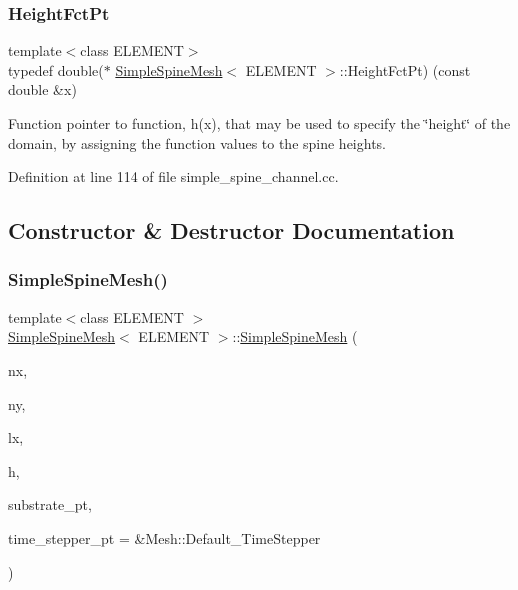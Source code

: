 \subsubsection{\texorpdfstring{Height\+Fct\+Pt}{HeightFctPt}}
{\footnotesize\ttfamily template$<$class E\+L\+E\+M\+E\+NT$>$ \\
typedef double($\ast$ \hyperlink{classSimpleSpineMesh}{Simple\+Spine\+Mesh}$<$ E\+L\+E\+M\+E\+NT $>$\+::Height\+Fct\+Pt) (const double \&x)}



Function pointer to function, h(x), that may be used to specify the \char`\"{}height\char`\"{} of the domain, by assigning the function values to the spine heights. 



Definition at line 114 of file simple\+\_\+spine\+\_\+channel.\+cc.



\subsection{Constructor \& Destructor Documentation}
\mbox{\label{classSimpleSpineMesh_a69815e3a950e6e5ede2f85004796dadb}} 
\subsubsection{\texorpdfstring{Simple\+Spine\+Mesh()}{SimpleSpineMesh()}}
{\footnotesize\ttfamily template$<$class E\+L\+E\+M\+E\+NT $>$ \\
\hyperlink{classSimpleSpineMesh}{Simple\+Spine\+Mesh}$<$ E\+L\+E\+M\+E\+NT $>$\+::\hyperlink{classSimpleSpineMesh}{Simple\+Spine\+Mesh} (\begin{DoxyParamCaption}\item[{const unsigned \&}]{nx,  }\item[{const unsigned \&}]{ny,  }\item[{const double \&}]{lx,  }\item[{const double \&}]{h,  }\item[{Geom\+Object $\ast$}]{substrate\+\_\+pt,  }\item[{Time\+Stepper $\ast$}]{time\+\_\+stepper\+\_\+pt = {\ttfamily \&Mesh\+:\+:Default\+\_\+TimeStepper} }\end{DoxyParamCaption})}



